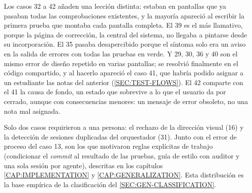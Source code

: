 Los casos 32 a 42 añaden una lección distinta: estaban en pantallas que ya pasaban
todas las comprobaciones existentes, y la mayoría apareció al escribir la primera
prueba que montaba cada pantalla completa. El 39 es el más llamativo, porque la página de
corrección, la central del sistema, no llegaba a pintarse desde su incorporación. El
35 pasaba desapercibido porque el síntoma solo era un aviso en la salida de errores
con todas las pruebas en verde. Y 29, 30, 36 y 40 son el mismo error de diseño
repetido en varias pantallas; se resolvió finalmente en el código compartido, y al
hacerlo apareció el caso 41, que habría podido asignar a un estudiante las notas del
anterior (\cref{SEC:TEST-FLOWS}). El 42 comparte con el 41 la causa de fondo, un
estado que sobrevive a lo que el usuario da por cerrado, aunque con consecuencias
menores: un mensaje de error obsoleto, no una nota mal asignada.

Solo dos casos requirieron a una persona: el rechazo de la dirección visual (16)
y la detección de sesiones duplicadas del orquestador (31). Junto con el error
de proceso del caso 13, son los que motivaron reglas explícitas de trabajo
(condicionar el \textit{commit} al resultado de las pruebas, guía de estilo con
auditor y una sola sesión por agente), descritas en los capítulos \ref{CAP:IMPLEMENTATION} y \ref{CAP:GENERALIZATION}.
Esta distribución es la base empírica de la clasificación del
\cref{SEC:GEN-CLASSIFICATION}.
